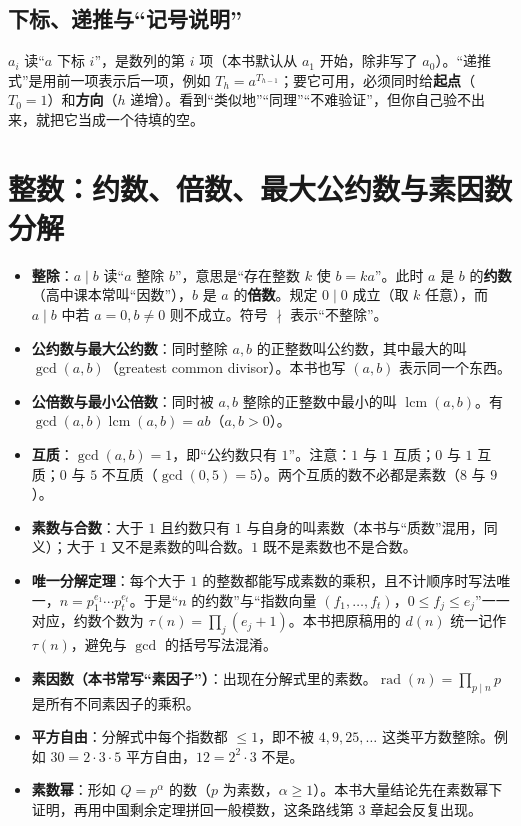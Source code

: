 \documentclass[UTF8,a4paper,11pt,twoside,openright,fontset=fandol]{ctexbook}
\theoremstyle{definition}
\newcommand{\lcm}{\operatorname{lcm}}
\newcommand{\rad}{\operatorname{rad}}
\begin{document}
\subsection{下标、递推与“记号说明”}
$a_i$ 读“$a$ 下标 $i$”，是数列的第 $i$ 项（本书默认从 $a_1$ 开始，除非写了 $a_0$）。“递推式”是用前一项表示后一项，例如 $T_h=a^{T_{h-1}}$；要它可用，必须同时给\textbf{起点}（$T_0=1$）和\textbf{方向}（$h$ 递增）。看到“类似地”“同理”“不难验证”，但你自己验不出来，就把它当成一个待填的空。

\section{整数：约数、倍数、最大公约数与素因数分解}
\begin{itemize}
\item \textbf{整除}：$a\mid b$ 读“$a$ 整除 $b$”，意思是“存在整数 $k$ 使 $b=ka$”。此时 $a$ 是 $b$ 的\textbf{约数}（高中课本常叫“因数”），$b$ 是 $a$ 的\textbf{倍数}。规定 $0\mid 0$ 成立（取 $k$ 任意），而 $a\mid b$ 中若 $a=0,b\ne0$ 则不成立。符号 $\nmid$ 表示“不整除”。
\item \textbf{公约数与最大公约数}：同时整除 $a,b$ 的正整数叫公约数，其中最大的叫 $\gcd(a,b)$（greatest common divisor）。本书也写 $(a,b)$ 表示同一个东西。
\item \textbf{公倍数与最小公倍数}：同时被 $a,b$ 整除的正整数中最小的叫 $\lcm(a,b)$。有 $\gcd(a,b)\lcm(a,b)=ab$（$a,b>0$）。
\item \textbf{互质}：$\gcd(a,b)=1$，即“公约数只有 $1$”。注意：$1$ 与 $1$ 互质；$0$ 与 $1$ 互质；$0$ 与 $5$ 不互质（$\gcd(0,5)=5$）。两个互质的数不必都是素数（$8$ 与 $9$）。
\item \textbf{素数与合数}：大于 $1$ 且约数只有 $1$ 与自身的叫素数（本书与“质数”混用，同义）；大于 $1$ 又不是素数的叫合数。$1$ 既不是素数也不是合数。
\item \textbf{唯一分解定理}：每个大于 $1$ 的整数都能写成素数的乘积，且不计顺序时写法唯一，$n=p_1^{e_1}\cdots p_t^{e_t}$。于是“$n$ 的约数”与“指数向量 $(f_1,\ldots,f_t)$，$0\le f_j\le e_j$”一一对应，约数个数为
$\tau(n)=\prod_j(e_j+1)$。本书把原稿用的 $d(n)$ 统一记作 $\tau(n)$，避免与 $\gcd$ 的括号写法混淆。
\item \textbf{素因数（本书常写“素因子”）}：出现在分解式里的素数。$\rad(n)=\prod_{p\mid n}p$ 是所有不同素因子的乘积。
\item \textbf{平方自由}：分解式中每个指数都 $\le1$，即不被 $4,9,25,\ldots$ 这类平方数整除。例如 $30=2\cdot3\cdot5$ 平方自由，$12=2^2\cdot3$ 不是。
\item \textbf{素数幂}：形如 $Q=p^\alpha$ 的数（$p$ 为素数，$\alpha\ge1$）。本书大量结论先在素数幂下证明，再用中国剩余定理拼回一般模数，这条路线第 3 章起会反复出现。
\end{itemize}
\end{document}
